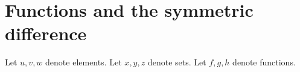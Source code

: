 \documentclass[../../set-theory.ftl.tex]{subfiles}
\begin{document}
  \section{Functions and the symmetric difference}

  \begin{forthel}
  \end{forthel}

  \begin{forthel}
  \end{forthel}

  \begin{forthel}
    Let $u,v,w$ denote elements.
    Let $x,y,z$ denote sets.
    Let $f,g,h$ denote functions.
  \end{forthel}
\end{document}
